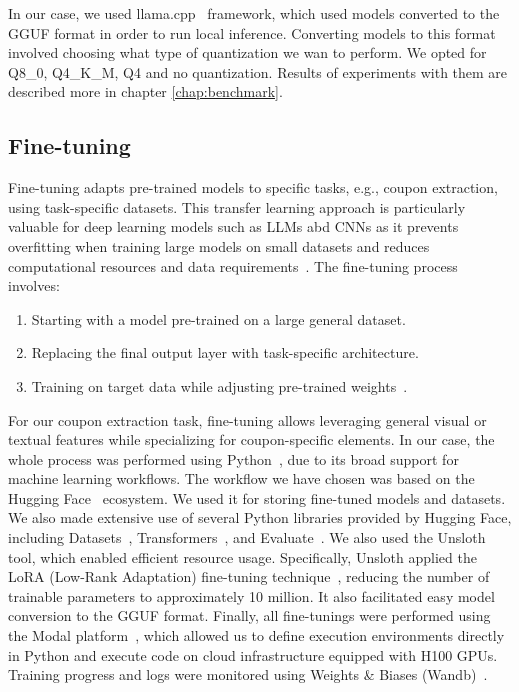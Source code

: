 \documentclass[licencjacka,en]{pracamgr}
\begin{document}
In our case, we used llama.cpp~\cite{llama-cpp} framework, which used models converted to the GGUF format in order to run local inference. Converting models to this format involved choosing what type of quantization we wan to perform. We opted for Q8\_0, Q4\_K\_M, Q4 and no quantization. Results of experiments with them are described more in chapter \ref{chap:benchmark}.

\subsection{Fine-tuning}
Fine-tuning adapts pre-trained models to specific tasks, e.g., coupon extraction, using task-specific datasets. This transfer learning approach is particularly valuable for deep learning models such as LLMs abd CNNs as it prevents overfitting when training large models on small datasets and reduces computational resources and data requirements~\cite{ibm_fine-tuning}. The fine-tuning process involves:
\begin{enumerate}
    \item Starting with a model pre-trained on a large general dataset.
    \item Replacing the final output layer with task-specific architecture.
    \item Training on target data while adjusting pre-trained weights~\cite{finetune_cool_image}.
\end{enumerate}

For our coupon extraction task, fine-tuning allows leveraging general visual or textual features while specializing for coupon-specific elements. In our case, the whole process was performed using Python~\cite{python}, due to its broad support for machine learning workflows. The workflow we have chosen was based on the Hugging Face~\cite{hugging-face} ecosystem. We used it for storing fine-tuned models and datasets. We also made extensive use of several Python libraries provided by Hugging Face, including Datasets~\cite{lhoest2021datasetscommunitylibrarynatural}, Transformers~\cite{wolf-etal-2020-transformers}, and Evaluate~\cite{evaluate}. We also used the Unsloth~\cite{unsloth} tool, which enabled efficient resource usage. Specifically, Unsloth applied the LoRA (Low-Rank Adaptation) fine-tuning technique~\cite{hu2021loralowrankadaptationlarge}, reducing the number of trainable parameters to approximately 10 million. It also facilitated easy model conversion to the GGUF format. Finally, all fine-tunings were performed using the Modal platform~\cite{modal}, which allowed us to define execution environments directly in Python and execute code on cloud infrastructure equipped with H100 GPUs. Training progress and logs were monitored using Weights \& Biases (Wandb)~\cite{wandb}.
\end{document}
